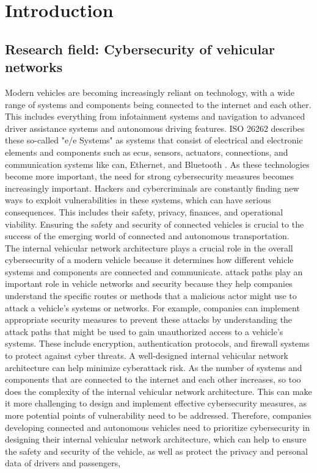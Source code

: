 \chapter{Introduction}
\label{chp:introduction}

\section{Research field: Cybersecurity of vehicular networks}
\label{sec:field}

Modern vehicles are becoming increasingly reliant on technology, with a wide range of systems and components being connected to the internet and each other. 
This includes everything from infotainment systems and navigation to advanced driver assistance systems and autonomous driving features.
ISO 26262 describes these so-called "\gls{e/e} Systems" as systems that consist of electrical and electronic elements and components such as \gls{ecu}s, sensors, actuators, connections, and communication systems like \gls{can}, Ethernet, and Bluetooth \cite{iso26262}.
As these technologies become more important, the need for strong cybersecurity measures becomes increasingly important. 
Hackers and cybercriminals are constantly finding new ways to exploit vulnerabilities in these systems, which can have serious consequences. 
This includes their safety, privacy, finances, and operational viability. Ensuring the safety and security of connected vehicles is crucial to the success of the emerging world of connected and autonomous transportation.
\\

The internal vehicular network architecture plays a crucial role in the overall cybersecurity of a modern vehicle because it determines how different vehicle systems and components are connected and communicate. 
\gls{attack path}s play an important role in vehicle networks and security because they help companies understand the specific routes or methods that a malicious actor might use to attack a vehicle's systems or networks. 
For example, companies can implement appropriate security measures to prevent these attacks by understanding the attack paths that might be used to gain unauthorized access to a vehicle's systems. 
These include encryption, authentication protocols, and firewall systems to protect against cyber threats. 
A well-designed internal vehicular network architecture can help minimize cyberattack risk. 
As the number of systems and components that are connected to the internet and each other increases, so too does the complexity of the internal vehicular network architecture. 
This can make it more challenging to design and implement effective cybersecurity measures, as more potential points of vulnerability need to be addressed. 
Therefore, companies developing connected and autonomous vehicles need to prioritize cybersecurity in designing their internal vehicular network architecture, 
which can help to ensure the safety and security of the vehicle, as well as protect the privacy and personal data of drivers and passengers,
\\

